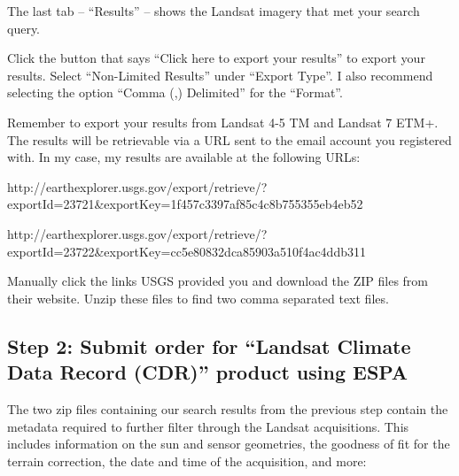 \documentclass{article}
\begin{document}
The last tab -- ``Results'' -- shows the Landsat imagery that met your
search query.

Click the button that says ``Click here to export your results'' to
export your results. Select ``Non-Limited Results'' under ``Export
Type''. I also recommend selecting the option ``Comma (,) Delimited''
for the ``Format''.

Remember to export your results from Landsat 4-5 TM and Landsat 7 ETM+.
The results will be retrievable via a URL sent to the email account you
registered with. In my case, my results are available at the following
URLs:

http://earthexplorer.usgs.gov/export/retrieve/?exportId=23721\&exportKey=1f457c3397af85c4c8b755355eb4eb52

http://earthexplorer.usgs.gov/export/retrieve/?exportId=23722\&exportKey=cc5e80832dca85903a510f4ac4ddb311

Manually click the links USGS provided you and download the ZIP files
from their website. Unzip these files to find two comma separated text
files.

    \subsection{Step 2: Submit order for ``Landsat Climate Data Record
(CDR)'' product using
ESPA}\label{step-2-submit-order-for-landsat-climate-data-record-cdr-product-using-espa}

The two zip files containing our search results from the previous step
contain the metadata required to further filter through the Landsat
acquisitions. This includes information on the sun and sensor
geometries, the goodness of fit for the terrain correction, the date and
time of the acquisition, and more:
\end{document}
